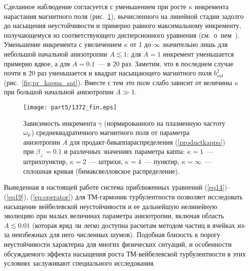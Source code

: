 Сделанное наблюдение согласуется с уменьшением при росте $\kappa$ инкремента нарастания магнитного поля (рис.~\ref{fig:pr_kappa_inkr}), вычисленного на линейной стадии задолго до насыщения неустойчивости и примерно равного максимальному инкременту, получающемуся из соответствующего дисперсионного уравнения (см.~о~нем~\cite{Mikhailovsky1971, Lazar2006, Vagin2014, Kocharovsky2016,Ruyer2015,Silva2021}). Уменьшение инкремента с увеличением $\kappa$ от 1 до $\infty$ значительно лишь для небольшой начальной анизотропии $A \lesssim 1$: для $A=1$ инкремент уменьшается примерно вдвое, а для $A=0.1$~--- в 20 раз. Заметим, что в последнем случае почти в 20 раз уменьшается и квадрат насыщающего магнитного поля $b_{sat}^2$ (рис.~\ref{fig:pr_kappa_sat}). Вместе с тем это поле слабо зависит от величины $\kappa$ при большой начальной анизотропии $A \gg 1$.
\begin{figure}[h]
\texttt{[image: part5/1372\_fin.eps]}
\caption{Зависимость инкремента $\gamma$ (нормированного на плазменную частоту $\omega_\mathrm{p}$) среднеквадратичного магнитного поля от параметра анизотропии $A$ для продакт-бикаппа{\PunctumKappa}распределения (\ref{productkappa}) при $\beta_\perp=0.1$ и различных значениях параметра каппа: $\kappa=1$~--- штрихпунктир, $\kappa=2$~--- штрихи, $\kappa=4$~--- пунктир, $\kappa=\infty$~--- сплошная кривая (бимаксвелловское распределение).}
\label{fig:pr_kappa_inkr}
\end{figure}
Выведенная в настоящей работе система приближенных уравнений (\ref{eq14})--(\ref{eq19}), (\ref{eq:operator}) для ТМ-гармоник турбулентности позволяет исследовать  насыщение вейбелевской неустойчивости и ее дальнейшую нелинейную эволюцию при малых величинах параметра анизотропии, включая область $A \lesssim 0.01$ (которая вряд ли легко доступна расчетам методом частиц в ячейках из-за неизбежных для него численных шумов). Подобная близость к порогу неустойчивости характерна для многих физических ситуаций, и особенности обсуждаемого эффекта насыщения роста ТМ-вейбелевской турбулентности в этих условиях заслуживают специального исследования.


